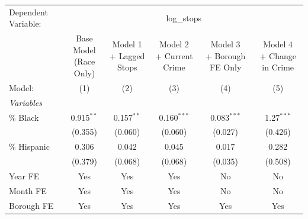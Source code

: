 \begingroup
\centering
\begin{tabular}{lccccc}
   \tabularnewline \midrule \midrule
   Dependent Variable: & \multicolumn{5}{c}{log\_stops}\\
                & \makecell{Base Model\\(Race Only)}    & \makecell{Model 1\\+ Lagged Stops}    & \makecell{Model 2\\+ Current Crime}    & \makecell{Model 3\\+ Borough FE Only}    & \makecell{Model 4\\+ Change in Crime} \\      
   Model:       & (1)                                   & (2)                                   & (3)                                    & (4)                                      & (5)\\  
   \midrule
   \emph{Variables}\\
   \% Black     & 0.915$^{**}$                          & 0.157$^{**}$                          & 0.160$^{***}$                          & 0.083$^{***}$                            & 1.27$^{***}$\\   
                & (0.355)                               & (0.060)                               & (0.060)                                & (0.027)                                  & (0.426)\\   
   \% Hispanic  & 0.306                                 & 0.042                                 & 0.045                                  & 0.017                                    & 0.282\\   
                & (0.379)                               & (0.068)                               & (0.068)                                & (0.035)                                  & (0.508)\\   
   Year FE      & Yes                                   & Yes                                   & Yes                                    & No                                       & No\\  
   Month FE     & Yes                                   & Yes                                   & Yes                                    & No                                       & No\\  
   Borough FE   & Yes                                   & Yes                                   & Yes                                    & Yes                                      & Yes\\  

\end{tabular}
